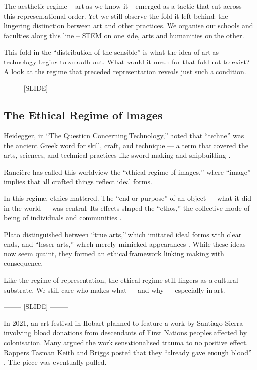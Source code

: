 \documentclass[letter:wpaper]{article}
\begin{document}
    The aesthetic regime -- art as we know it -- emerged as a tactic that cut across this representational order. Yet we still observe the fold it left behind: the lingering distinction between art and other practices. We organise our schools and faculties along this line -- STEM on one side, arts and humanities on the other.

    This fold in the ``distribution of the sensible'' \citep[p.42]{RancierPltcsOfThAsthtcs2004} is what the idea of art as technology begins to smooth out. What would it mean for that fold not to exist? A look at the regime that preceded representation reveals just such a condition.

-------- [SLIDE] --------

    \subsection{The Ethical Regime of Images}

    Heidegger, in ``The Question Concerning Technology,'' noted that ``techne'' was the ancient Greek word for skill, craft, and technique — a term that covered the arts, sciences, and technical practices like sword-making and shipbuilding \citep[p.34]{HeideggerThQstnCncrngTchnlgy1954}.

    Rancière has called this worldview the ``ethical regime of images,'' where ``image'' implies that all crafted things reflect ideal forms.
    
    In this regime, ethics mattered. The ``end or purpose'' of an object — what it did in the world — was central. Its effects shaped the ``ethos,'' the collective mode of being of individuals and communities \citep[pp.20--21]{RancierPltcsOfThAsthtcs2004}.
    
    Plato distinguished between ``true arts,'' which imitated ideal forms with clear ends, and ``lesser arts,'' which merely mimicked appearances \citep[p.20]{RancierPltcsOfThAsthtcs2004}. While these ideas now seem quaint, they formed an ethical framework linking making with consequence.
    
    Like the regime of representation, the ethical regime still lingers as a cultural substrate. We still care who makes what — and why — especially in art.
    
    -------- [SLIDE] --------
    
    In 2021, an art festival in Hobart planned to feature a work by Santiago Sierra involving blood donations from descendants of First Nations peoples affected by colonisation. Many argued the work sensationalised trauma to no positive effect. Rappers Tasman Keith and Briggs posted that they ``already gave enough blood'' \citep{DrkMfBld2021}. The piece was eventually pulled.
    
\end{document}
